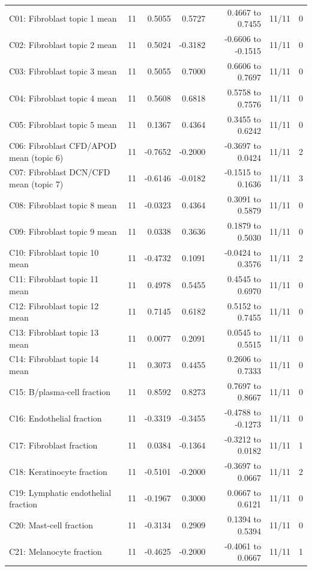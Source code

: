 \documentclass[10pt,a4paper]{article}
\begin{document}
{{\begin{longtable}{@{}p{.29\linewidth}rrrrrr@{}}
\endfoot\bottomrule\endlastfoot
C01: Fibroblast topic 1 mean & 11 & 0.5055 & 0.5727 & 0.4667 to 0.7455 & 11/11 & 0 \\
C02: Fibroblast topic 2 mean & 11 & 0.5024 & -0.3182 & -0.6606 to -0.1515 & 11/11 & 0 \\
C03: Fibroblast topic 3 mean & 11 & 0.5055 & 0.7000 & 0.6606 to 0.7697 & 11/11 & 0 \\
C04: Fibroblast topic 4 mean & 11 & 0.5608 & 0.6818 & 0.5758 to 0.7576 & 11/11 & 0 \\
C05: Fibroblast topic 5 mean & 11 & 0.1367 & 0.4364 & 0.3455 to 0.6242 & 11/11 & 0 \\
C06: Fibroblast CFD/APOD mean (topic 6) & 11 & -0.7652 & -0.2000 & -0.3697 to 0.0424 & 11/11 & 2 \\
C07: Fibroblast DCN/CFD mean (topic 7) & 11 & -0.6146 & -0.0182 & -0.1515 to 0.1636 & 11/11 & 3 \\
C08: Fibroblast topic 8 mean & 11 & -0.0323 & 0.4364 & 0.3091 to 0.5879 & 11/11 & 0 \\
C09: Fibroblast topic 9 mean & 11 & 0.0338 & 0.3636 & 0.1879 to 0.5030 & 11/11 & 0 \\
C10: Fibroblast topic 10 mean & 11 & -0.4732 & 0.1091 & -0.0424 to 0.3576 & 11/11 & 2 \\
C11: Fibroblast topic 11 mean & 11 & 0.4978 & 0.5455 & 0.4545 to 0.6970 & 11/11 & 0 \\
C12: Fibroblast topic 12 mean & 11 & 0.7145 & 0.6182 & 0.5152 to 0.7455 & 11/11 & 0 \\
C13: Fibroblast topic 13 mean & 11 & 0.0077 & 0.2091 & 0.0545 to 0.5515 & 11/11 & 0 \\
C14: Fibroblast topic 14 mean & 11 & 0.3073 & 0.4455 & 0.2606 to 0.7333 & 11/11 & 0 \\
C15: B/plasma-cell fraction & 11 & 0.8592 & 0.8273 & 0.7697 to 0.8667 & 11/11 & 0 \\
C16: Endothelial fraction & 11 & -0.3319 & -0.3455 & -0.4788 to -0.1273 & 11/11 & 0 \\
C17: Fibroblast fraction & 11 & 0.0384 & -0.1364 & -0.3212 to 0.0182 & 11/11 & 1 \\
C18: Keratinocyte fraction & 11 & -0.5101 & -0.2000 & -0.3697 to 0.0667 & 11/11 & 2 \\
C19: Lymphatic endothelial fraction & 11 & -0.1967 & 0.3000 & 0.0667 to 0.6121 & 11/11 & 0 \\
C20: Mast-cell fraction & 11 & -0.3134 & 0.2909 & 0.1394 to 0.5394 & 11/11 & 0 \\
C21: Melanocyte fraction & 11 & -0.4625 & -0.2000 & -0.4061 to 0.0667 & 11/11 & 1 \\

\end{longtable}}}
\end{document}
